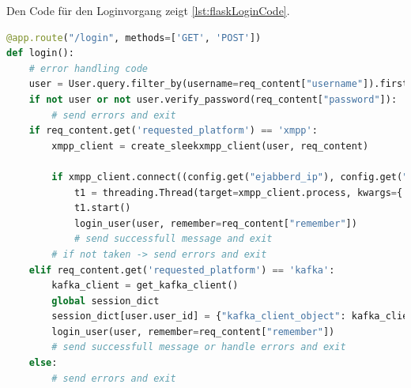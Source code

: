 \documentclass[a4paper,titlepage,halfparskip,12pt]{scrreprt}
\begin{document}
\begin{onehalfspacing}
Den Code für den Loginvorgang zeigt \autoref{lst:flaskLoginCode}.

\begin{lstlisting}[language=python, caption={Code der \acs{API}-Route für den Benutzerlogin}, label={lst:flaskLoginCode}]
@app.route("/login", methods=['GET', 'POST'])
def login():
    # error handling code
    user = User.query.filter_by(username=req_content["username"]).first()
    if not user or not user.verify_password(req_content["password"]):
        # send errors and exit
    if req_content.get('requested_platform') == 'xmpp':
        xmpp_client = create_sleekxmpp_client(user, req_content)

        if xmpp_client.connect((config.get("ejabberd_ip"), config.get("ejabberd_port"))):
            t1 = threading.Thread(target=xmpp_client.process, kwargs={'block': True}, daemon=True)
            t1.start()
            login_user(user, remember=req_content["remember"])
            # send successfull message and exit
        # if not taken -> send errors and exit
    elif req_content.get('requested_platform') == 'kafka':
        kafka_client = get_kafka_client()
        global session_dict
        session_dict[user.user_id] = {"kafka_client_object": kafka_client, "topic": user.kafka_topic_id, "requested_platform": "kafka"}
        login_user(user, remember=req_content["remember"])
        # send successfull message or handle errors and exit
    else:
        # send errors and exit
\end{lstlisting}


\end{onehalfspacing}
\end{document}
